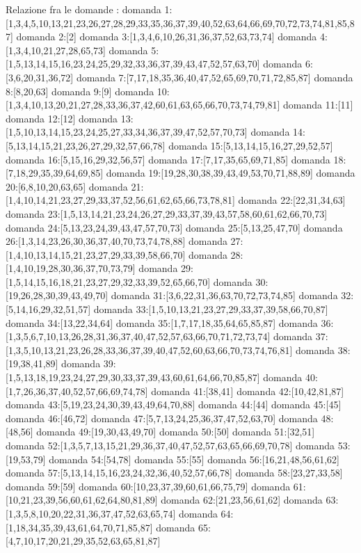 Relazione fra le domande :
domanda 1:[1,3,4,5,10,13,21,23,26,27,28,29,33,35,36,37,39,40,52,63,64,66,69,70,72,73,74,81,85,87]
domanda 2:[2]
domanda 3:[1,3,4,6,10,26,31,36,37,52,63,73,74]
domanda 4:[1,3,4,10,21,27,28,65,73]
domanda 5:[1,5,13,14,15,16,23,24,25,29,32,33,36,37,39,43,47,52,57,63,70]
domanda 6:[3,6,20,31,36,72]
domanda 7:[7,17,18,35,36,40,47,52,65,69,70,71,72,85,87]
domanda 8:[8,20,63]
domanda 9:[9]
domanda 10:[1,3,4,10,13,20,21,27,28,33,36,37,42,60,61,63,65,66,70,73,74,79,81]
domanda 11:[11]
domanda 12:[12]
domanda 13:[1,5,10,13,14,15,23,24,25,27,33,34,36,37,39,47,52,57,70,73]
domanda 14:[5,13,14,15,21,23,26,27,29,32,57,66,78]
domanda 15:[5,13,14,15,16,27,29,52,57]
domanda 16:[5,15,16,29,32,56,57]
domanda 17:[7,17,35,65,69,71,85]
domanda 18:[7,18,29,35,39,64,69,85]
domanda 19:[19,28,30,38,39,43,49,53,70,71,88,89]
domanda 20:[6,8,10,20,63,65]
domanda 21:[1,4,10,14,21,23,27,29,33,37,52,56,61,62,65,66,73,78,81]
domanda 22:[22,31,34,63]
domanda 23:[1,5,13,14,21,23,24,26,27,29,33,37,39,43,57,58,60,61,62,66,70,73]
domanda 24:[5,13,23,24,39,43,47,57,70,73]
domanda 25:[5,13,25,47,70]
domanda 26:[1,3,14,23,26,30,36,37,40,70,73,74,78,88]
domanda 27:[1,4,10,13,14,15,21,23,27,29,33,39,58,66,70]
domanda 28:[1,4,10,19,28,30,36,37,70,73,79]
domanda 29:[1,5,14,15,16,18,21,23,27,29,32,33,39,52,65,66,70]
domanda 30:[19,26,28,30,39,43,49,70]
domanda 31:[3,6,22,31,36,63,70,72,73,74,85]
domanda 32:[5,14,16,29,32,51,57]
domanda 33:[1,5,10,13,21,23,27,29,33,37,39,58,66,70,87]
domanda 34:[13,22,34,64]
domanda 35:[1,7,17,18,35,64,65,85,87]
domanda 36:[1,3,5,6,7,10,13,26,28,31,36,37,40,47,52,57,63,66,70,71,72,73,74]
domanda 37:[1,3,5,10,13,21,23,26,28,33,36,37,39,40,47,52,60,63,66,70,73,74,76,81]
domanda 38:[19,38,41,89]
domanda 39:[1,5,13,18,19,23,24,27,29,30,33,37,39,43,60,61,64,66,70,85,87]
domanda 40:[1,7,26,36,37,40,52,57,66,69,74,78]
domanda 41:[38,41]
domanda 42:[10,42,81,87]
domanda 43:[5,19,23,24,30,39,43,49,64,70,88]
domanda 44:[44]
domanda 45:[45]
domanda 46:[46,72]
domanda 47:[5,7,13,24,25,36,37,47,52,63,70]
domanda 48:[48,56]
domanda 49:[19,30,43,49,70]
domanda 50:[50]
domanda 51:[32,51]
domanda 52:[1,3,5,7,13,15,21,29,36,37,40,47,52,57,63,65,66,69,70,78]
domanda 53:[19,53,79]
domanda 54:[54,78]
domanda 55:[55]
domanda 56:[16,21,48,56,61,62]
domanda 57:[5,13,14,15,16,23,24,32,36,40,52,57,66,78]
domanda 58:[23,27,33,58]
domanda 59:[59]
domanda 60:[10,23,37,39,60,61,66,75,79]
domanda 61:[10,21,23,39,56,60,61,62,64,80,81,89]
domanda 62:[21,23,56,61,62]
domanda 63:[1,3,5,8,10,20,22,31,36,37,47,52,63,65,74]
domanda 64:[1,18,34,35,39,43,61,64,70,71,85,87]
domanda 65:[4,7,10,17,20,21,29,35,52,63,65,81,87]
